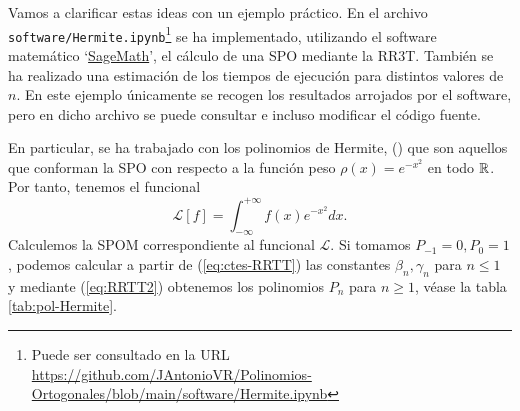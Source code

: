 \begin{ejemplo}
    \label{ej:hermite-rr3t}
    Vamos a clarificar estas ideas con un ejemplo práctico. En el archivo \texttt{software/Hermite.ipynb}\footnote{Puede ser consultado en la URL \url{https://github.com/JAntonioVR/Polinomios-Ortogonales/blob/main/software/Hermite.ipynb}} se ha implementado, utilizando el software matemático `\href{https://www.sagemath.org/}{SageMath}', el cálculo de una SPO mediante la RR3T. También se ha realizado una estimación de los tiempos de ejecución para distintos valores de $n$. En este ejemplo únicamente se recogen los resultados arrojados por el software, pero en dicho archivo se puede consultar e incluso modificar el código fuente.
    
    En particular, se ha trabajado con los polinomios de Hermite, () que son aquellos que conforman la SPO con respecto a la función peso $\rho(x)=e^{-x^2}$ en todo $\mathbb{R}$. Por tanto, tenemos el funcional
    $$
    \mathcal{L}[f] = \int_{-\infty}^{+\infty} f(x) e^{-x^2}dx.
    $$
    Calculemos la SPOM correspondiente al funcional $\mathcal L$. Si tomamos $P_{-1}=0, P_0=1$, podemos calcular a partir de (\ref{eq:ctes-RRTT}) las constantes $\beta_n,\gamma_n$ para $n\leq 1$ y mediante (\ref{eq:RRTT2}) obtenemos los polinomios $P_n$ para $n\geq 1$, véase la tabla \ref{tab:pol-Hermite}.


\end{ejemplo}
